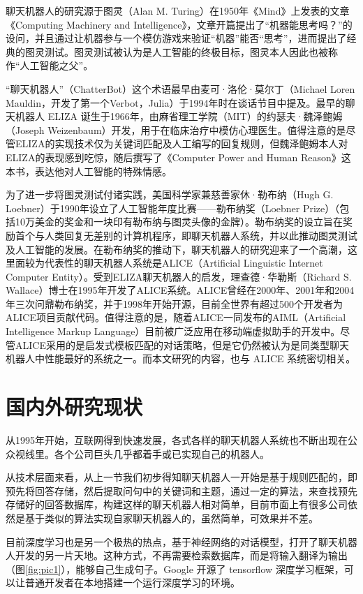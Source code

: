 \documentclass[bachelor,winfonts]{jnuthesis}
\begin{document}
聊天机器人的研究源于图灵（Alan M. Turing）在1950年《Mind》上发表的文章《Computing Machinery and Intelligence》，文章开篇提出了“机器能思考吗？”的设问，并且通过让机器参与一个模仿游戏来验证“机器”能否“思考”，进而提出了经典的图灵测试。图灵测试被认为是人工智能的终极目标，图灵本人因此也被称作“人工智能之父”。

“聊天机器人”（ChatterBot）这个术语最早由麦可·洛伦·莫尔丁（Michael Loren Mauldin，开发了第一个Verbot，Julia）于1994年时在谈话节目中提及。最早的聊天机器人 ELIZA 诞生于1966年，由麻省理工学院（MIT）的约瑟夫·魏泽鲍姆（Joseph Weizenbaum）开发，用于在临床治疗中模仿心理医生。值得注意的是尽管ELIZA的实现技术仅为关键词匹配及人工编写的回复规则，但魏泽鲍姆本人对ELIZA的表现感到吃惊，随后撰写了《Computer Power and Human Reason》这本书，表达他对人工智能的特殊情感。

为了进一步将图灵测试付诸实践，美国科学家兼慈善家休·勒布纳（Hugh G. Loebner）于1990年设立了人工智能年度比赛——勒布纳奖（Loebner Prize）（包括10万美金的奖金和一块印有勒布纳与图灵头像的金牌）。勒布纳奖的设立旨在奖励首个与人类回复无差别的计算机程序，即聊天机器人系统，并以此推动图灵测试及人工智能的发展。在勒布纳奖的推动下，聊天机器人的研究迎来了一个高潮，这里面较为代表性的聊天机器人系统是ALICE（Artificial Linguistic Internet Computer Entity）\cite{alicewebsite}。受到ELIZA聊天机器人的启发，理查德·华勒斯（Richard S. Wallace）博士在1995年开发了ALICE系统。ALICE曾经在2000年、2001年和2004年三次问鼎勒布纳奖，并于1998年开始开源，目前全世界有超过500个开发者为ALICE项目贡献代码。值得注意的是，随着ALICE一同发布的AIML（Artificial Intelligence Markup Language）目前被广泛应用在移动端虚拟助手的开发中。尽管ALICE采用的是启发式模板匹配的对话策略，但是它仍然被认为是同类型聊天机器人中性能最好的系统之一。而本文研究的内容，也与 ALICE 系统密切相关。


\section{国内外研究现状}
从1995年开始，互联网得到快速发展，各式各样的聊天机器人系统也不断出现在公众视线里。各个公司巨头几乎都着手或已实现自己的机器人。

从技术层面来看，从上一节我们初步得知聊天机器人一开始是基于规则匹配的，即预先将回答存储，然后提取问句中的关键词和主题，通过一定的算法，来查找预先存储好的回答数据库，构建这样的聊天机器人相对简单，目前市面上有很多公司依然是基于类似的算法实现自家聊天机器人的，虽然简单，可效果并不差。

目前深度学习也是另一个极热的热点，基于神经网络的对话模型\cite{seq2seq}，打开了聊天机器人开发的另一片天地。这种方式，不再需要检索数据库，而是将输入翻译为输出（图\ref{fig:pic1}），能够自己生成句子。Google 开源了 tensorflow 深度学习框架，可以让普通开发者在本地搭建一个运行深度学习的环境。
\end{document}
